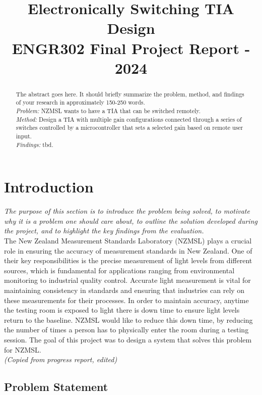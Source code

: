 \documentclass[conference]{IEEEtran}
\title{Electronically Switching TIA Design \\
    \large ENGR302 Final Project Report - 2024}
\author{
    \IEEEauthorblockN{Evgeny Zhilkin, Louis Smith, Mario Pankusz, Max Mawby}
    \IEEEauthorblockA{
        Electrical \& Electronics Engineering \\
        Te Herenga Waka - Victoria University of Wellington \\
        Wellington, Aotearoa New Zealand \\
    }
}
\begin{document}
\maketitle

\begin{abstract}
The abstract goes here. It should briefly summarize the problem, method, and findings of your research in approximately 150-250 words. \\

\textit{Problem:} NZMSL wants to have a TIA that can be switched remotely. \\
\textit{Method:} Design a TIA with multiple gain configurations connected through a series of switches controlled by a microcontroller that sets a selected gain based on remote user input. \\
\textit{Findings:} tbd.


\end{abstract}


\section{Introduction}
\textit{ The purpose of this section is to introduce the problem being solved, to motivate why it is a problem one should care about, to outline the solution developed during the project, and to highlight the key findings from the evaluation.} \\

The New Zealand Measurement Standards Laboratory (NZMSL) plays a crucial role in ensuring the accuracy of measurement standards in New Zealand. One of their key responsibilities is the precise measurement of light levels from different sources, which is fundamental for applications ranging from environmental monitoring to industrial quality control. Accurate light measurement is vital for maintaining consistency in standards and ensuring that industries can rely on these measurements for their processes. In order to maintain accuracy, anytime the testing room is exposed to light there is down time to ensure light levels return to the baseline. NZMSL would like to reduce this down time, by reducing the number of times a person has to physically enter the room during a testing session. The goal of this project was to design a system that solves this problem for NZMSL. \\
\textit{(Copied from progress report, edited)}

\subsection{Problem Statement}
\end{document}
